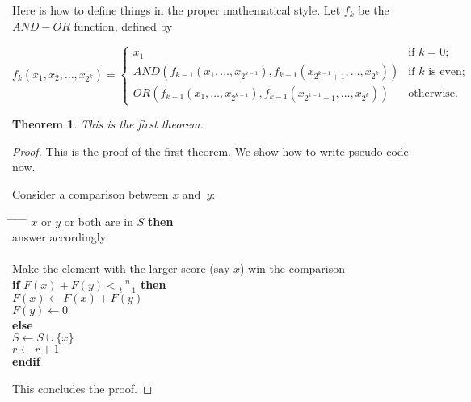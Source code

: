 \documentclass[twoside]{article}
\newcounter{lecnum}
\newtheorem{theorem}{Theorem}[lecnum]
\begin{document}
Here is how to define things in the proper mathematical style.
Let $f_k$ be the $AND-OR$ function, defined by

\[ f_k(x_1, x_2, \ldots, x_{2^k}) = \left\{ \begin{array}{ll}

	x_1 & \mbox{if $k = 0$;} \\

	AND(f_{k-1}(x_1, \ldots, x_{2^{k-1}}),
	   f_{k-1}(x_{2^{k-1} + 1}, \ldots, x_{2^k}))
	 & \mbox{if $k$ is even;} \\

	OR(f_{k-1}(x_1, \ldots, x_{2^{k-1}}),
	   f_{k-1}(x_{2^{k-1} + 1}, \ldots, x_{2^k}))	
	& \mbox{otherwise.} 
	\end{array}
	\right. \]

\begin{theorem}
This is the first theorem.
\end{theorem}

\begin{proof}
This is the proof of the first theorem. We show how to write pseudo-code now.

Consider a comparison between $x$ and~$y$:
\begin{tabbing}
\hspace*{.25in} \= \hspace*{.25in} \= \hspace*{.25in} \= \hspace*{.25in} \= \hspace*{.25in} \=\kill
{} $x$ or $y$ or both are in $S$ {\bf then } \\
\>\> answer accordingly \\
 \\
\>\>    Make the element with the larger score (say $x$) win the comparison \\
\>\> {\bf if} $F(x) + F(y) < \frac{n}{t-1}$ {\bf then} \\%
\>\>\> $F(x) \leftarrow F(x) + F(y)$ \\
\>\>\> $F(y) \leftarrow 0$ \\
\>\> {\bf else}  \\
\>\>\> $S \leftarrow S \cup \{ x \} $ \\
\>\>\> $r \leftarrow r+1$ \\
\>\> {\bf endif} \\
\end{tabbing}

This concludes the proof.
\end{proof}
\end{document}
